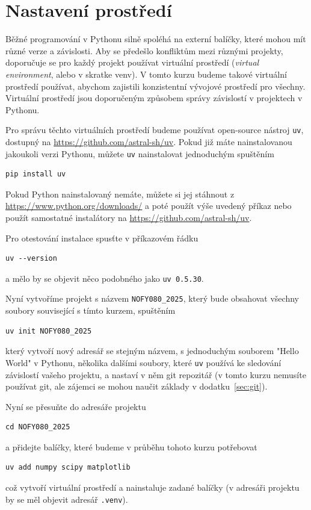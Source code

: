 \newpage
\section{Nastavení prostředí}
Běžné programování v Pythonu silně spoléhá na externí balíčky, které mohou mít různé verze a závislosti. Aby se předešlo konfliktům mezi různými projekty, doporučuje se pro každý projekt používat virtuální prostředí (\emph{virtual environment}, alebo v skratke venv). V tomto kurzu budeme takové virtuální prostředí používat, abychom zajistili konzistentní vývojové prostředí pro všechny. Virtuální prostředí jsou doporučeným způsobem správy závislostí v projektech v Pythonu.

Pro správu těchto virtuálních prostředí budeme používat open-source nástroj \verb|uv|, dostupný na \url{https://github.com/astral-sh/uv}. Pokud již máte nainstalovanou jakoukoli verzi Pythonu, můžete \verb|uv| nainstalovat jednoduchým spuštěním
\begin{lstlisting}
pip install uv
\end{lstlisting}
Pokud Python nainstalovaný nemáte, můžete si jej stáhnout z \url{https://www.python.org/downloads/} a poté použít výše uvedený příkaz nebo použít samostatné instalátory na \url{https://github.com/astral-sh/uv}.

Pro otestování instalace spusťte v příkazovém řádku
\begin{lstlisting}
uv --version
\end{lstlisting}
a mělo by se objevit něco podobného jako \verb|uv 0.5.30|.

Nyní vytvoříme projekt s názvem \verb|NOFY080_2025|, který bude obsahovat všechny soubory související s tímto kurzem, spuštěním
\begin{lstlisting}
uv init NOFY080_2025
\end{lstlisting}
který vytvoří nový adresář se stejným názvem, s jednoduchým souborem "Hello World" v Pythonu, několika dalšími soubory, které \verb|uv| používá ke sledování závislostí vašeho projektu, a nastaví v něm git repozitář (v tomto kurzu nemusíte používat git, ale zájemci se mohou naučit základy v dodatku~\ref{sec:git}).

Nyní se přesuňte do adresáře projektu
\begin{lstlisting}
cd NOFY080_2025
\end{lstlisting}
a přidejte balíčky, které budeme v průběhu tohoto kurzu potřebovat
\begin{lstlisting}
uv add numpy scipy matplotlib
\end{lstlisting}
což vytvoří virtuální prostředí a nainstaluje zadané balíčky (v adresáři projektu by se měl objevit adresář \verb|.venv|).

